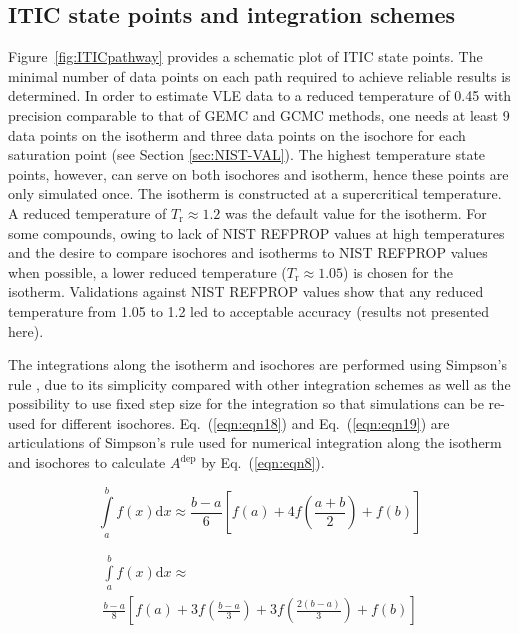 \documentclass[5p,times]{elsarticle}
\begin{document}
\subsection{ITIC state points and integration schemes}\label{sec:ITIC-state-points}
Figure~\ref{fig:ITICpathway} provides a schematic plot of ITIC state points. The minimal number of data points on each path required to achieve reliable results is determined. 
In order to estimate VLE data to a reduced temperature of 0.45 with precision comparable to that of GEMC and GCMC methods, one needs at least 9 data points on the isotherm and three data points on the isochore for each saturation point (see Section \ref{sec:NIST-VAL}).
The highest temperature state points, however, can serve on both isochores and isotherm, hence these points are only simulated once. The isotherm is constructed at a supercritical temperature. A reduced temperature of $T_\mathrm{r} \approx 1.2$ was the default value for the isotherm. For some compounds, owing to lack of NIST REFPROP values at high temperatures and the desire to compare isochores and isotherms to NIST REFPROP values when possible, a lower reduced temperature ($T_\mathrm{r} \approx 1.05$) is chosen for the isotherm. Validations against NIST REFPROP values show that any reduced temperature from 1.05 to 1.2 led to acceptable accuracy (results not presented here).


The integrations along the isotherm and isochores are performed using Simpson's rule \cite{atkinson2008}, due to its simplicity compared with other integration schemes as well as the possibility to use fixed step size for the integration so that simulations can be re-used for different isochores. Eq.~(\ref{eqn:eqn18}) and Eq.~(\ref{eqn:eqn19}) are
articulations of Simpson's rule used for numerical integration along the isotherm and isochores to calculate $A^{\mathrm{dep}}$ by Eq.~(\ref{eqn:eqn8}).

\begin{equation}
\int\limits_a^b {f(x)\mathrm{d} x \approx \frac{{b - a}}{6}} \left[ {f(a) + 4f \left( \frac{{a + b}}{2} \right) + f(b)} \right] \label{eqn:eqn18}
\end{equation}

\begin{equation}
\begin{array}{l}
{\int\limits_a^b f(x)\mathrm{d}x \approx }
\\ 
{{\frac{{b - a}}{8} \left[ {f(a) + 3f \left( \frac{{b - a}}{3} \right) + 3f \left( \frac{{2(b - a)}}{3} \right) + f(b)} \right]}}  
\end{array}
\label{eqn:eqn19}
\end{equation}
\end{document}
